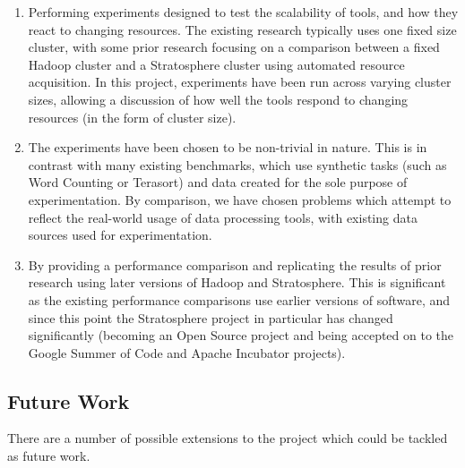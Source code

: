 \begin{enumerate}
	\item Performing experiments designed to test the scalability of tools, and how they react to changing resources. The existing research typically uses one fixed size cluster, with some prior research focusing on a comparison between a fixed Hadoop cluster and a Stratosphere cluster using automated resource acquisition. In this project, experiments have been run across varying cluster sizes, allowing a discussion of how well the tools respond to changing resources (in the form of cluster size).
	\item The experiments have been chosen to be non-trivial in nature. This is in contrast with many existing benchmarks, which use synthetic tasks (such as Word Counting or Terasort) and data created for the sole purpose of experimentation. By comparison, we have chosen problems which attempt to reflect the real-world usage of data processing tools, with existing data sources used for experimentation. 
	\item By providing a performance comparison and replicating the results of prior research using later versions of Hadoop and Stratosphere. This is significant as the existing performance comparisons use earlier versions of software, and since this point the Stratosphere project in particular has changed significantly (becoming an Open Source project and being accepted on to the Google Summer of Code and Apache Incubator projects).
\end{enumerate}

\subsection{Future Work}
There are a number of possible extensions to the project which could be tackled as future work.

